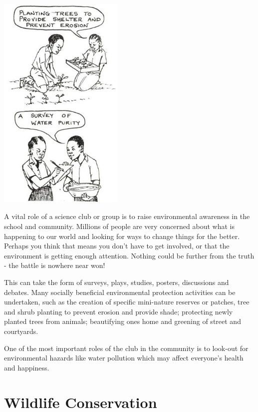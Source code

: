 \begin{multicols}{2}
\begin{center}
\includegraphics[width=0.45\textwidth]{./img/source/environmental-awareness.jpg}
\end{center}

A vital role of a science club or group is to raise
environmental awareness in the school and
community. Millions of people are very
concerned about what is happening to our world
and looking for ways to change things for the
better. Perhaps you think that means you don't
have to get involved, or that the environment is
getting enough attention. Nothing could be
further from the truth - the battle is nowhere near
won! 

This can take the form of surveys, plays,
studies, posters, discussions and debates. Many
socially beneficial environmental protection
activities can be undertaken, such as the creation
of specific mini-nature reserves or patches, tree
and shrub planting to prevent erosion and provide
shade; protecting newly planted trees from
animals; beautifying ones home and greening of
street and courtyards. 

One of the most important
roles of the club in the community is to look-out
for environmental hazards like water pollution
which may affect everyone's health and
happiness.


\section{Wildlife Conservation} 


\end{multicols}
